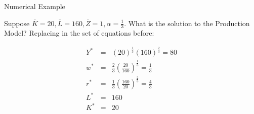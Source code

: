 \documentclass[notes,11pt, aspectratio=169, xcolor=table]{beamer}
\begin{document}
\begin{frame}{Numerical Example}

Suppose $\bar{K} = 20, \bar{L} = 160, \bar{Z}=1, \alpha=\frac{1}{3}$. What is the solution to the Production Model? Replacing in the set of equations before:

  \begin{eqnarray*}
    Y^* &=&  (20)^{\frac{1}{3}}  (160)^{\frac{2}{3}} = 80 \\
    w^* &=& \frac{2}{3} \left( \frac{20}{160} \right)^{\frac{1}{3}} = \frac{1}{3} \\
     r^* &=&  \frac{1}{3} \left( \frac{160}{20} \right)^{\frac{2}{3}} = \frac{4}{3}  \\
     L^* &=& 160  \\
     K^* &=& 20
  \end{eqnarray*}
\end{frame}
\end{document}
